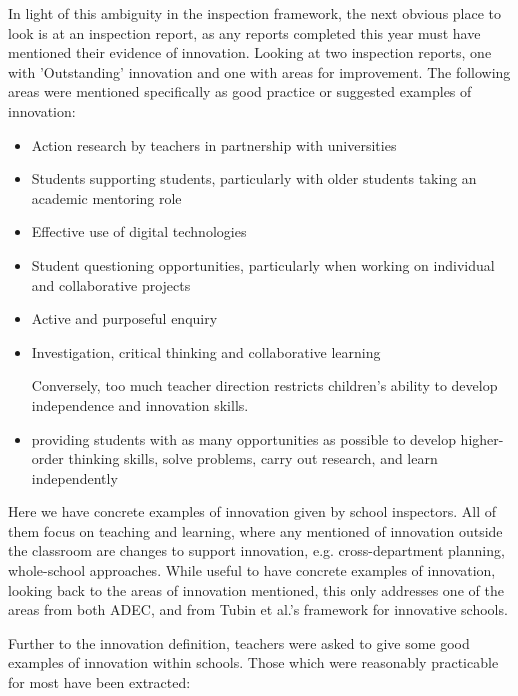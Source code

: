 In light of this ambiguity in the inspection framework, the next obvious place to look is at an inspection report, as any reports completed this year must have mentioned their evidence of innovation. Looking at two inspection reports, one with 'Outstanding' innovation and one with areas for improvement. The following areas were mentioned specifically as good practice or suggested examples of innovation:
\begin{itemize}
\item Action research by teachers in partnership with universities
\item Students supporting students, particularly with older students taking an academic mentoring role
\item Effective use of digital technologies
\item Student questioning opportunities, particularly when working on individual and collaborative projects
\item Active and purposeful enquiry 
\item Investigation, critical thinking and collaborative learning
\item [Conversely,] too much teacher direction restricts children’s ability to develop independence and innovation skills.
\item providing students with as many opportunities as possible to develop higher-order thinking skills, solve problems, carry out research, and learn independently
\end{itemize}

Here we have concrete examples of innovation given by school inspectors. All of them focus on teaching and learning, where any mentioned of innovation outside the classroom are changes to support innovation, e.g. cross-department planning, whole-school approaches. While useful to have concrete examples of innovation, looking back to the areas of innovation mentioned, this only addresses one of the areas from both ADEC, and from Tubin et al.'s framework for innovative schools.

Further to the innovation definition, teachers were asked to give some good examples of innovation within schools. Those which were reasonably practicable for most have been extracted: 

